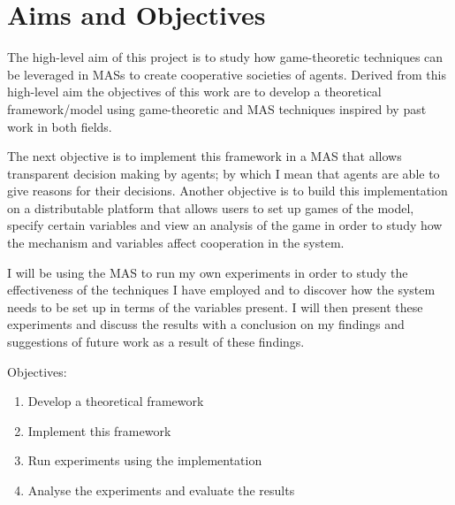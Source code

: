 \documentclass[]{final_report}
\begin{document}
\section{Aims and Objectives}
\label{sec:aao}
The high-level aim of this project is to study how game-theoretic techniques can be leveraged in MASs to create cooperative societies of agents. Derived from this high-level aim the objectives of this work are to develop a theoretical framework/model using game-theoretic and MAS techniques inspired by past work in both fields.\par 
The next objective is to implement this framework in a MAS that allows transparent decision making by agents; by which I mean that agents are able to give reasons for their decisions. Another objective is to build this implementation on a distributable platform that allows users to set up games of the model, specify certain variables and view an analysis of the game in order to study how the mechanism and variables affect cooperation in the system.\par
I will be using the MAS to run my own experiments in order to study the effectiveness of the techniques I have employed and to discover how the system needs to be set up in terms of the variables present. I will then present these experiments and discuss the results with a conclusion on my findings and suggestions of future work as a result of these findings.\par
Objectives:
\begin{enumerate}
	\item Develop a theoretical framework
	\item Implement this framework
	\item Run experiments using the implementation
	\item Analyse the experiments and evaluate the results
\end{enumerate}
\end{document}
